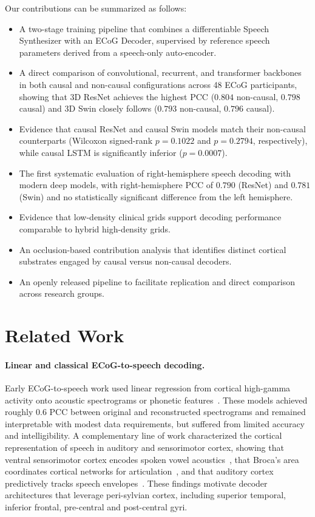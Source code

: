 Our contributions can be summarized as follows:
\begin{itemize}
\item A two-stage training pipeline that combines a differentiable Speech Synthesizer with an ECoG Decoder, supervised by reference speech parameters derived from a speech-only auto-encoder.
\item A direct comparison of convolutional, recurrent, and transformer backbones in both causal and non-causal configurations across 48 ECoG participants, showing that 3D ResNet achieves the highest PCC ($0.804$ non-causal, $0.798$ causal) and 3D Swin closely follows ($0.793$ non-causal, $0.796$ causal).
\item Evidence that causal ResNet and causal Swin models match their non-causal counterparts (Wilcoxon signed-rank $p=0.1022$ and $p=0.2794$, respectively), while causal LSTM is significantly inferior ($p=0.0007$).
\item The first systematic evaluation of right-hemisphere speech decoding with modern deep models, with right-hemisphere PCC of $0.790$ (ResNet) and $0.781$ (Swin) and no statistically significant difference from the left hemisphere.
\item Evidence that low-density clinical grids support decoding performance comparable to hybrid high-density grids.
\item An occlusion-based contribution analysis that identifies distinct cortical substrates engaged by causal versus non-causal decoders.
\item An openly released pipeline to facilitate replication and direct comparison across research groups.
\end{itemize}

\section{Related Work}

\paragraph{Linear and classical ECoG-to-speech decoding.}
Early ECoG-to-speech work used linear regression from cortical high-gamma activity onto acoustic spectrograms or phonetic features~\cite{pasley2012reconstructing,mugler2014direct,herff2015brain}. These models achieved roughly $0.6$ PCC between original and reconstructed spectrograms and remained interpretable with modest data requirements, but suffered from limited accuracy and intelligibility. A complementary line of work characterized the cortical representation of speech in auditory and sensorimotor cortex, showing that ventral sensorimotor cortex encodes spoken vowel acoustics~\cite{bouchard2014control}, that Broca's area coordinates cortical networks for articulation~\cite{flinker2015redefining,wang2021dynamics}, and that auditory cortex predictively tracks speech envelopes~\cite{golumbic2013visual,yildiz2016predictive}. These findings motivate decoder architectures that leverage peri-sylvian cortex, including superior temporal, inferior frontal, pre-central and post-central gyri.

